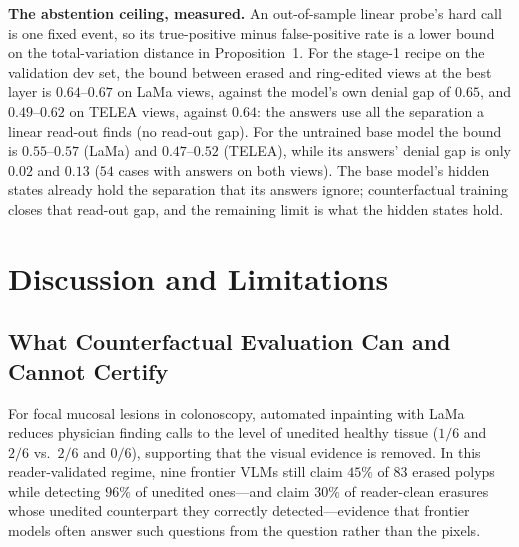\documentclass[journal]{IEEEtran}
\begin{document}
\textbf{The abstention ceiling, measured.} An out-of-sample linear probe's hard call is one fixed event, so its true-positive minus false-positive rate is a lower bound on the total-variation distance in Proposition~1. For the stage-1 recipe on the validation dev set, the bound between erased and ring-edited views at the best layer is $0.64$--$0.67$ on LaMa views, against the model's own denial gap of $0.65$, and $0.49$--$0.62$ on TELEA views, against $0.64$: the answers use all the separation a linear read-out finds (no read-out gap). For the untrained base model the bound is $0.55$--$0.57$ (LaMa) and $0.47$--$0.52$ (TELEA), while its answers' denial gap is only $0.02$ and $0.13$ ($54$ cases with answers on both views). The base model's hidden states already hold the separation that its answers ignore; counterfactual training closes that read-out gap, and the remaining limit is what the hidden states hold.

\section{Discussion and Limitations}
\label{sec:discussion}

\subsection{What Counterfactual Evaluation Can and Cannot Certify}
\label{subsec:disc_certify}
For focal mucosal lesions in colonoscopy, automated inpainting with LaMa reduces physician finding calls to the level of unedited healthy tissue ($1/6$ and $2/6$ vs.\ $2/6$ and $0/6$), supporting that the visual evidence is removed. In this reader-validated regime, nine frontier VLMs still claim $45\%$ of $83$ erased polyps while detecting $96\%$ of unedited ones---and claim $30\%$ of reader-clean erasures whose unedited counterpart they correctly detected---evidence that frontier models often answer such questions from the question rather than the pixels.
\end{document}
